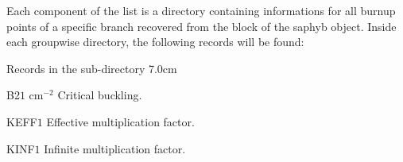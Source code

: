 Each component of the list  is a directory containing informations for all  burnup points of a specific branch recovered from the  block of the saphyb object. Inside each groupwise directory, the following records will be found:

  \begin{DescriptionEnregistrement}{Records 
 in the sub-directory  }{7.0cm} \label{tabl:tabDI}
 
 \RealEnr
 {B2}{$1$} { cm$^{-2}$} 
 {Critical buckling. }
 
 \RealEnr
 {KEFF}{$1$} { } 
 {Effective multiplication factor. }
 
 \RealEnr
 {KINF}{$1$} { } 
 {Infinite multiplication factor. }
 
 \end{DescriptionEnregistrement} 


